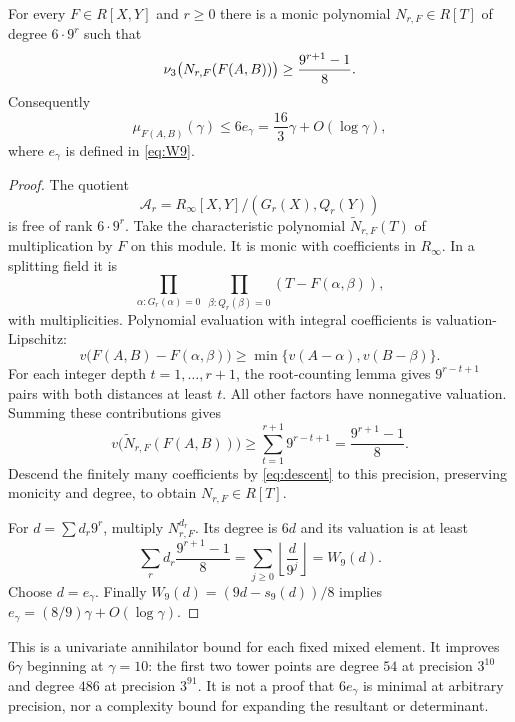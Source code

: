 \begin{theorem}\label{thm:norm}
For every $F\in R[X,Y]$ and $r\ge0$ there is a monic polynomial
$N_{r,F}\in R[T]$ of degree $6\cdot9^r$ such that
\begin{equation}\label{eq:normval}
 \nu_3\bigl(N_{r,F}(F(A,B))\bigr)\ge\frac{9^{r+1}-1}{8}.
\end{equation}
Consequently
\begin{equation}\label{eq:allupper}
 \mu_{F(A,B)}(\gamma)\le6e_\gamma
 =\frac{16}{3}\gamma+O(\log\gamma),
\end{equation}
where $e_\gamma$ is defined in \eqref{eq:W9}.
\end{theorem}
\begin{proof}
The quotient
\[
 \mathcal A_r=R_\infty[X,Y]/(G_r(X),Q_r(Y))
\]
is free of rank $6\cdot9^r$. Take the characteristic polynomial
$\widetilde N_{r,F}(T)$ of multiplication by $F$ on this module.
It is monic with coefficients in $R_\infty$. In a splitting field it is
\[
 \prod_{\alpha:G_r(\alpha)=0}\ \prod_{\beta:Q_r(\beta)=0}
           (T-F(\alpha,\beta)),
\]
with multiplicities. Polynomial evaluation with integral coefficients
is valuation-Lipschitz:
\[
 v\bigl(F(A,B)-F(\alpha,\beta)\bigr)
 \ge\min\{v(A-\alpha),v(B-\beta)\}.
\]
For each integer depth $t=1,\ldots,r+1$, the root-counting lemma
gives $9^{r-t+1}$ pairs with both distances at least $t$.
All other factors have nonnegative valuation. Summing these contributions
gives
\[
 v\bigl(\widetilde N_{r,F}(F(A,B))\bigr)
 \ge\sum_{t=1}^{r+1}9^{r-t+1}=\frac{9^{r+1}-1}{8}.
\]
Descend the finitely many coefficients by \eqref{eq:descent} to this
precision, preserving monicity and degree, to obtain $N_{r,F}\in R[T]$.

For $d=\sum d_r9^r$, multiply $N_{r,F}^{d_r}$.
Its degree is $6d$ and its valuation is at least
\[
 \sum_r d_r\frac{9^{r+1}-1}{8}
 =\sum_{j\ge0}\left\lfloor\frac d{9^j}\right\rfloor=W_9(d).
\]
Choose $d=e_\gamma$. Finally $W_9(d)=(9d-s_9(d))/8$
implies $e_\gamma=(8/9)\gamma+O(\log\gamma)$.
\end{proof}

\begin{remark}
This is a univariate annihilator bound for each fixed mixed element.
It improves $6\gamma$ beginning at $\gamma=10$: the first two tower
points are degree $54$ at precision $3^{10}$ and degree $486$ at
precision $3^{91}$. It is not a proof that $6e_\gamma$ is minimal
at arbitrary precision, nor a complexity bound for expanding the
resultant or determinant.
\end{remark}

